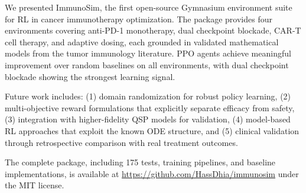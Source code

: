 \documentclass[11pt,a4paper]{article}
\begin{document}
We presented ImmunoSim, the first open-source Gymnasium environment suite for RL in cancer immunotherapy optimization. The package provides four environments covering anti-PD-1 monotherapy, dual checkpoint blockade, CAR-T cell therapy, and adaptive dosing, each grounded in validated mathematical models from the tumor immunology literature. PPO agents achieve meaningful improvement over random baselines on all environments, with dual checkpoint blockade showing the strongest learning signal.

Future work includes: (1) domain randomization for robust policy learning, (2) multi-objective reward formulations that explicitly separate efficacy from safety, (3) integration with higher-fidelity QSP models for validation, (4) model-based RL approaches that exploit the known ODE structure, and (5) clinical validation through retrospective comparison with real treatment outcomes.

The complete package, including 175 tests, training pipelines, and baseline implementations, is available at \url{https://github.com/HassDhia/immunosim} under the MIT license.



\end{document}
